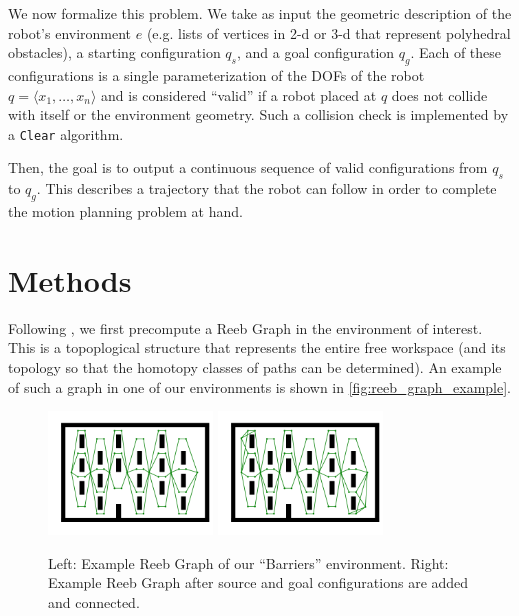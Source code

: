\documentclass[conference]{IEEEtran}
\begin{document}
We now formalize this problem. We take as input the geometric description of the robot's environment $e$ (e.g. lists of vertices in 2-d or 3-d that represent polyhedral obstacles), a starting configuration $q_s$, and a goal configuration $q_g$. Each of these configurations is a single parameterization of the DOFs of the robot $q = \langle x_1, \dots, x_n \rangle$ and is considered ``valid'' if a robot placed at $q$ does not collide with itself or the environment geometry. Such a collision check is implemented by a \texttt{Clear} algorithm.

Then, the goal is to output a continuous sequence of valid configurations from $q_s$ to $q_g$. This describes a trajectory that the robot can follow in order to complete the motion planning problem at hand.

\section{Methods}

Following \cite{DRRRT}, we first precompute a Reeb Graph in the environment of interest. This is a topoplogical structure that represents the entire free workspace (and its topology so that the homotopy classes of paths can be determined). An example of such a graph in one of our environments is shown in \autoref{fig:reeb_graph_example}.

\begin{figure}[h]
	\centering
	\includegraphics[width=1.72in]{figures/partial_reeb_graph_example.pdf}
	\includegraphics[width=1.72in]{figures/full_reeb_graph_example.pdf}
	\caption{Left: Example Reeb Graph of our ``Barriers'' environment. Right: Example Reeb Graph after source and goal configurations are added and connected.}
	\label{fig:reeb_graph_example}
\end{figure}
\end{document}
